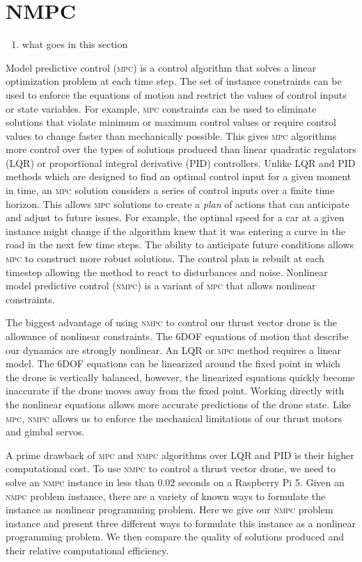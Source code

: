 \documentclass[]{article}
\newcommand{\mpc}{\textsc{mpc}}
\newcommand{\nmpc}{\textsc{nmpc}}
\begin{document}
	\section*{NMPC}


\begin{enumerate}
	\item what goes in this section
\end{enumerate}	

Model predictive control (\mpc) is a control algorithm that solves a linear optimization problem at each time step. 
The set of instance constraints can be used to enforce the equations of motion and restrict the values of control inputs or state variables.  For example, {\mpc} constraints can be used to eliminate solutions that violate minimum or maximum control values or require control values to change faster than mechanically possible.  This gives {\mpc} algorithms more control over the types of solutions produced than linear quadratic regulators (LQR) or proportional integral derivative (PID) controllers.  
Unlike LQR and PID methods which are designed to find an optimal control input for a given moment in time, an {\mpc} solution considers a series of control inputs over a finite time horizon.  This allows {\mpc} solutions to create a {\em plan} of actions that can anticipate and adjust to future issues. For example, the optimal speed for a car at a given instance might change if the algorithm knew that it was entering a curve in the road in the next few time steps.
The ability to anticipate future conditions allows {\mpc} to construct more robust solutions. The control plan is rebuilt at each timestep allowing the method to react to disturbances and noise.
Nonlinear model predictive control (\nmpc) is a variant of {\mpc} that allows nonlinear constraints. 

The biggest advantage of using {\nmpc} to control our thrust vector drone is the allowance of nonlinear constraints. 
The 6DOF equations of motion that describe our dynamics are strongly nonlinear.  An LQR or {\mpc} method  requires a linear model. The 6DOF equations can be linearized around the fixed point in which the drone is vertically balanced, however, the linearized equations quickly become inaccurate if the drone moves away from the fixed point.  Working directly with the nonlinear equations allows more accurate predictions of the drone state. Like {\mpc}, {\nmpc}  allows us to enforce the mechanical limitations of our thrust motors and gimbal servos.


A prime drawback of {\mpc} and {\nmpc} algorithms over LQR and PID  is their higher computational cost.  To use {\nmpc} to control a thrust vector drone, we need to solve an {\nmpc} instance in less than $0.02$ seconds on a Raspberry Pi 5.  Given an {\nmpc} problem instance, there are a variety of known ways to formulate the instance as nonlinear programming problem.  Here we give our {\nmpc} problem instance and present three different ways to formulate this instance as a nonlinear programming problem.  We then compare the quality of  solutions produced and their relative computational efficiency.
\end{document}
